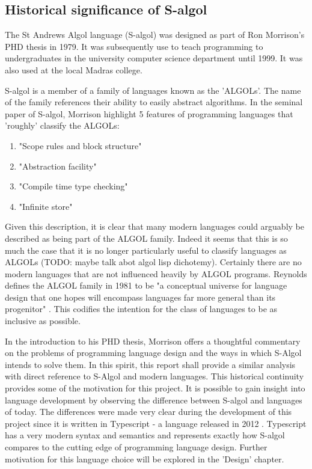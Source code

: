 \documentclass{article}
\begin{document}
\subsection{Historical significance of S-algol}

The St Andrews Algol language (S-algol) was designed as part of Ron Morrison's PHD thesis in 1979. It was subsequently use to teach programming to undergraduates in the university computer science department until 1999. It was also used at the local Madras college.

S-algol is a member of a family of languages known as the 'ALGOLs'. The name of the family references their ability to easily abstract algorithms. In the seminal paper of S-algol, Morrison highlight 5 features of programming languages that 'roughly' classify the ALGOLs:

\begin{enumerate}
    \item "Scope rules and block structure"
    \item "Abstraction facility"
    \item "Compile time type checking"
    \item "Infinite store"
\end{enumerate}

Given this description, it is clear that many modern languages could arguably be described as being part of the ALGOL family. Indeed it seems that this is so much the case that it is no longer particularly useful to classify languages as ALGOLs (TODO: maybe talk abot algol lisp dichotemy). Certainly there are no modern languages that are not influenced heavily by ALGOL programs. Reynolds defines the ALGOL family in 1981 to be "a conceptual universe for language design that one hopes will encompass languages far more general than its progenitor" \cite{reynolds}. This codifies the intention for the class of languages to be as inclusive as possible. 

In the introduction to his PHD thesis, Morrison offers a thoughtful commentary on the problems of programming language design and the ways in which S-Algol intends to solve them. In this spirit, this report shall provide a similar analysis with direct reference to S-Algol and modern languages. This historical continuity provides some of the motivation for this project. It is possible to gain insight into language development by observing the difference between S-algol and languages of today. The differences were made very clear during the development of this project since it is written in Typescript - a language released in 2012 \cite{jsconf}. Typescript has a very modern syntax and semantics and represents exactly how S-algol compares to the cutting edge of programming language design. Further motivation for this language choice will be explored in the 'Design' chapter.
\end{document}
